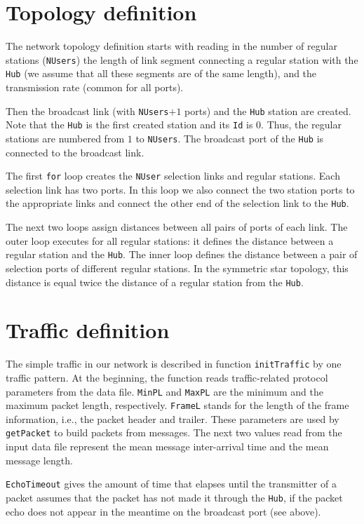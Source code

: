 \section{Topology definition}

The network topology definition
starts with reading in the number of regular stations ({\tt NUsers})
the length of link segment connecting a regular station with the {\tt Hub}
(we assume that all these segments are of the same length), and the
transmission rate (common for all ports).

Then the broadcast link (with {\tt NUsers}$+1$ ports)
and the {\tt Hub} station are created.
Note that the {\tt Hub} is the first created station and its {\tt Id} is
$0$.
Thus, the regular stations are numbered from $1$ to {\tt NUsers}.
The broadcast port of the {\tt Hub} is connected to the broadcast link.

The first {\tt for} loop creates the {\tt NUser} selection links and
regular stations.
Each selection link has two ports.
In this loop we also connect the two station ports to the appropriate links
and connect the other end of the selection link to the {\tt Hub}.

The next two loops assign distances between all pairs of ports of each
link.
The outer loop executes for all regular stations: it defines the distance
between a regular station and the {\tt Hub}.
The inner loop defines the distance between a pair of selection ports
of different regular stations.
In the symmetric
star topology, this distance is equal twice the distance of a regular
station from the {\tt Hub}.

\section{Traffic definition}

The simple traffic in our network is described in function {\tt initTraffic}
by one traffic pattern.
At the beginning, the function reads traffic-related protocol parameters from
the data file.
{\tt MinPL} and {\tt MaxPL} are the minimum and the maximum packet length,
respectively.
{\tt FrameL} stands for the length of the frame information, i.e., the
packet header and trailer.
These parameters are used by {\tt getPacket} to build packets from messages.
The next two values read from the input data file represent the mean
message inter-arrival time and the mean message length.

{\tt EchoTimeout} gives the amount of time that elapses until the
transmitter of a packet assumes that the packet has not made it through the
{\tt Hub}, if the packet echo does not appear in the meantime on the broadcast
port (see above).

